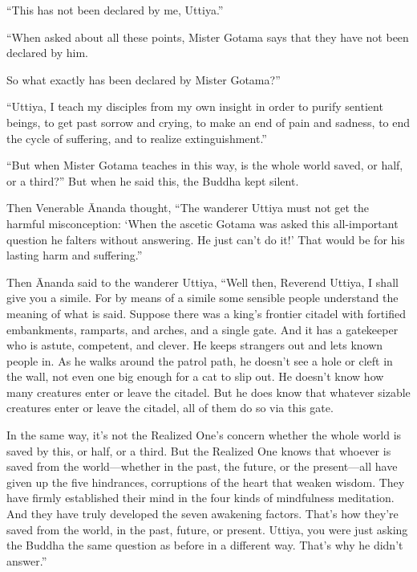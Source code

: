 \documentclass[12pt,openany]{book}%
\begin{document}
“This has not been declared by me, Uttiya.” 

“When asked about all these points, Mister Gotama says that they have not been declared by him. 

So what exactly has been declared by Mister Gotama?” 

“Uttiya, I teach my disciples from my own insight in order to purify sentient beings, to get past sorrow and crying, to make an end of pain and sadness, to end the cycle of suffering, and to realize extinguishment.” 

“But when Mister Gotama teaches in this way, is the whole world saved, or half, or a third?” But when he said this, the Buddha kept silent. 

Then Venerable Ānanda thought, “The wanderer Uttiya must not get the harmful misconception: ‘When the ascetic Gotama was asked this all-important question he falters without answering. He just can’t do it!’ That would be for his lasting harm and suffering.” 

Then Ānanda said to the wanderer Uttiya, “Well then, Reverend Uttiya, I shall give you a simile. For by means of a simile some sensible people understand the meaning of what is said. Suppose there was a king’s frontier citadel with fortified embankments, ramparts, and arches, and a single gate. And it has a gatekeeper who is astute, competent, and clever. He keeps strangers out and lets known people in. As he walks around the patrol path, he doesn’t see a hole or cleft in the wall, not even one big enough for a cat to slip out. He doesn’t know how many creatures enter or leave the citadel. But he does know that whatever sizable creatures enter or leave the citadel, all of them do so via this gate. 

In the same way, it’s not the Realized One’s concern whether the whole world is saved by this, or half, or a third. But the Realized One knows that whoever is saved from the world—whether in the past, the future, or the present—all have given up the five hindrances, corruptions of the heart that weaken wisdom. They have firmly established their mind in the four kinds of mindfulness meditation. And they have truly developed the seven awakening factors. That’s how they’re saved from the world, in the past, future, or present. Uttiya, you were just asking the Buddha the same question as before in a different way. That’s why he didn’t answer.” 
\end{document}
